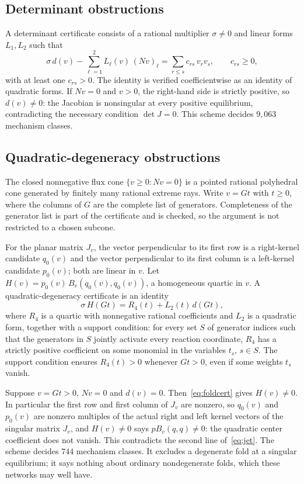 \documentclass[11pt,a4paper]{article}
\theoremstyle{plain}
\theoremstyle{definition}
\theoremstyle{remark}
\numberwithin{equation}{section}
\begin{document}
\subsection{Determinant obstructions}
A determinant certificate consists of a rational multiplier $\sigma\ne0$ and linear forms $L_1,L_2$ such that
\begin{equation}\label{eq:detcert}
 \sigma\,d(v)-\sum_{\ell=1}^2 L_\ell(v)\,(Nv)_\ell=\sum_{r\le s}c_{rs}\,v_rv_s,\qquad c_{rs}\ge0,
\end{equation}
with at least one $c_{rs}>0$. The identity is verified coefficientwise as an identity of quadratic forms. If $Nv=0$ and $v>0$, the right-hand side is strictly positive, so $d(v)\ne0$: the Jacobian is nonsingular at every positive equilibrium, contradicting the necessary condition $\det J=0$. This scheme decides $9{,}063$ mechanism classes.

\subsection{Quadratic-degeneracy obstructions}
The closed nonnegative flux cone $\{v\ge0:Nv=0\}$ is a pointed rational polyhedral cone generated by finitely many rational extreme rays. Write $v=Gt$ with $t\ge0$, where the columns of $G$ are the complete list of generators. Completeness of the generator list is part of the certificate and is checked, so the argument is not restricted to a chosen subcone.

For the planar matrix $J_v$, the vector perpendicular to its first row is a right-kernel candidate $q_0(v)$ and the vector perpendicular to its first column is a left-kernel candidate $p_0(v)$; both are linear in $v$. Let $H(v)=p_0(v)\,B_v(q_0(v),q_0(v))$, a homogeneous quartic in $v$. A quadratic-degeneracy certificate is an identity
\begin{equation}\label{eq:foldcert}
 \sigma\,H(Gt)=R_4(t)+L_2(t)\,d(Gt),
\end{equation}
where $R_4$ is a quartic with nonnegative rational coefficients and $L_2$ is a quadratic form, together with a support condition: for every set $S$ of generator indices such that the generators in $S$ jointly activate every reaction coordinate, $R_4$ has a strictly positive coefficient on some monomial in the variables $t_s$, $s\in S$. The support condition ensures $R_4(t)>0$ whenever $Gt>0$, even if some weights $t_s$ vanish.

Suppose $v=Gt>0$, $Nv=0$ and $d(v)=0$. Then~\eqref{eq:foldcert} gives $H(v)\ne0$. In particular the first row and first column of $J_v$ are nonzero, so $q_0(v)$ and $p_0(v)$ are nonzero multiples of the actual right and left kernel vectors of the singular matrix $J_v$, and $H(v)\ne0$ says $pB_v(q,q)\ne0$: the quadratic center coefficient does not vanish. This contradicts the second line of~\eqref{eq:jet}. The scheme decides $744$ mechanism classes. It excludes a degenerate fold at a singular equilibrium; it says nothing about ordinary nondegenerate folds, which these networks may well have.
\end{document}
